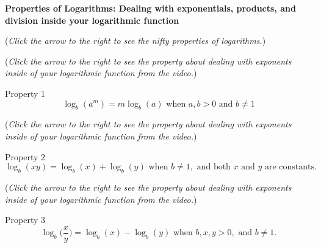 \documentclass{ximera}
\begin{document}
\textbf{Properties of Logarithms: Dealing with exponentials, products,
and division inside your logarithmic function}
\begin{exercise}
\begin{flushright}
{\color{blue}(\emph{Click the arrow to the right to see the nifty properties of logarithms.})}
\end{flushright}
\begin{center}
\begin{expandable}
{\color{blue}(\emph{Click the arrow to the right to see the property
about dealing with exponents inside of your logarithmic function from the video.})}
\begin{expandable}
Property 1
\[
\log_b(a^m) = m\log_b(a) \text{ when }a,b>0\text{ and }b\neq 1
\]
\end{expandable}
{\color{blue}(\emph{Click the arrow to the right to see the property
about dealing with exponents inside of your logarithmic function from the video.})}
\begin{expandable}
Property 2
\[
\log_b (xy) = \log_b(x) + \log_b(y) \text{ when }b\neq 1, \text{ and both }x \text{ and }y\text{ are constants.}
\]
\end{expandable}
{\color{blue}(\emph{Click the arrow to the right to see the property
about dealing with exponents inside of your logarithmic function from the video.})}
\begin{expandable}
Property 3
\[
\log_b \Big(\frac{x}{y}\Big) = \log_b(x) - \log_b(y) \text{ when }b,x,y>0,\text{ and }b\neq 1.
\]
\end{expandable}
\end{expandable}
\end{center}
\end{exercise}
\end{document}
